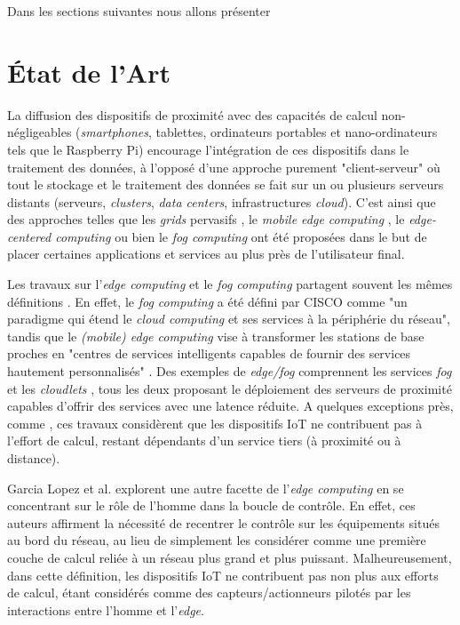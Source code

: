 Dans les sections suivantes nous allons présenter %

\section{État de l'Art}

La diffusion des dispositifs de proximité avec des capacités de calcul non-négligeables (\textit{smartphones}, tablettes, ordinateurs portables et nano-ordinateurs tels que le Raspberry Pi) encourage l'intégration de ces dispositifs dans le traitement des données, à l'opposé d'une approche purement "client-serveur" où tout le stockage et le traitement des données se fait sur un ou plusieurs serveurs distants (serveurs, \textit{clusters}, \textit{data centers}, infrastructures \textit{cloud}). C'est ainsi que des approches telles que les \textit{grids} pervasifs \cite{Parashar2010}, le \textit{mobile edge computing} \cite {Dey2013,MEC,Satyanarayanan09}, le \textit{edge-centered computing} \cite{Lopez2015} ou bien le \textit{fog computing} \cite{Bonomi2012} ont été proposées dans le but de placer certaines applications et services au plus près de l'utilisateur final.

Les travaux sur l'\textit{edge computing} et le \textit{fog computing} partagent souvent les mêmes définitions \cite{Vermesan}. En effet, le \textit{fog computing} a été défini par CISCO \cite{FogCISCO} comme "un paradigme qui étend le \textit{cloud computing} et ses services à la périphérie du réseau", tandis que le \textit{(mobile) edge computing} vise à transformer les stations de base proches en "centres de services intelligents capables de fournir des services hautement personnalisés" \cite{Vermesan}. Des exemples de \textit{edge/fog} comprennent les services \textit{fog} \cite{Bonomi2012} et les \textit{cloudlets} \cite{Satyanarayanan09}, tous les deux proposant le déploiement des serveurs de proximité capables d'offrir des services avec une latence réduite. A quelques exceptions près, comme \cite{Dey2013}, ces travaux considèrent que les dispositifs IoT ne contribuent pas à l'effort de calcul, restant dépendants d'un service tiers (à proximité ou à distance).

Garcia Lopez et al. \cite{Lopez2015} explorent une autre facette de l'\textit{edge computing} en se concentrant sur le rôle de l'homme dans la boucle de contrôle. En effet, ces auteurs affirment la nécessité de recentrer le contrôle sur les équipements situés au bord du réseau, au lieu de simplement les considérer comme une première couche de calcul reliée à un réseau plus grand et plus puissant. %
Malheureusement, dans cette définition, les dispositifs IoT ne contribuent pas non plus aux efforts de calcul, étant considérés comme des capteurs/actionneurs pilotés par les interactions entre l'homme et l'\textit{edge}.

